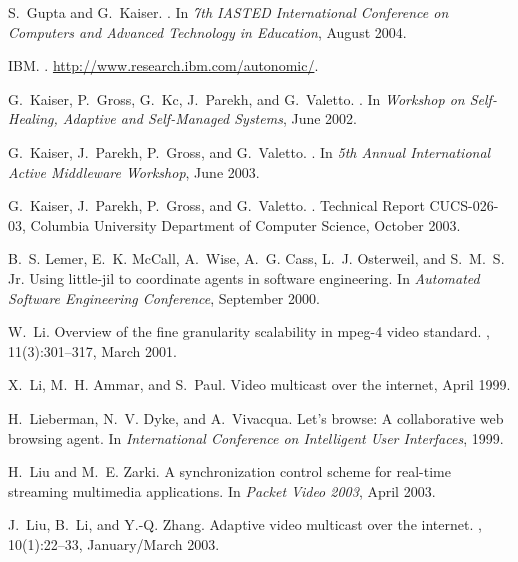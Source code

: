 \documentclass{sig-alternate}
\begin{document}
\begin{thebibliography}{10}
S.~Gupta and G.~Kaiser.
.
\newblock In {\em 7th IASTED International Conference on Computers and Advanced
  Technology in Education}, August 2004.

{IBM}.
.
\newblock \url{http://www.research.ibm.com/autonomic/}.

G.~Kaiser, P.~Gross, G.~Kc, J.~Parekh, and G.~Valetto.
.
\newblock In {\em Workshop on Self-Healing, Adaptive and Self-Managed Systems},
  June 2002.

G.~Kaiser, J.~Parekh, P.~Gross, and G.~Valetto.
.
\newblock In {\em 5th Annual International Active Middleware Workshop}, June
  2003.

G.~Kaiser, J.~Parekh, P.~Gross, and G.~Valetto.
.
\newblock Technical Report CUCS-026-03, Columbia University Department of
  Computer Science, October 2003.

B.~S. Lemer, E.~K. McCall, A.~Wise, A.~G. Cass, L.~J. Osterweil, and S.~M.~S.
  Jr.
\newblock Using little-jil to coordinate agents in software engineering.
\newblock In {\em Automated Software Engineering Conference}, September 2000.

W.~Li.
\newblock Overview of the fine granularity scalability in mpeg-4 video
  standard.
,
  11(3):301--317, March 2001.

X.~Li, M.~H. Ammar, and S.~Paul.
\newblock Video multicast over the internet, April 1999.

H.~Lieberman, N.~V. Dyke, and A.~Vivacqua.
\newblock Let's browse: A collaborative web browsing agent.
\newblock In {\em International Conference on Intelligent User Interfaces},
  1999.

H.~Liu and M.~E. Zarki.
\newblock A synchronization control scheme for real-time streaming multimedia
  applications.
\newblock In {\em Packet Video 2003}, April 2003.

J.~Liu, B.~Li, and Y.-Q. Zhang.
\newblock Adaptive video multicast over the internet.
, 10(1):22--33, January/March 2003.


\end{thebibliography}
\end{document}
